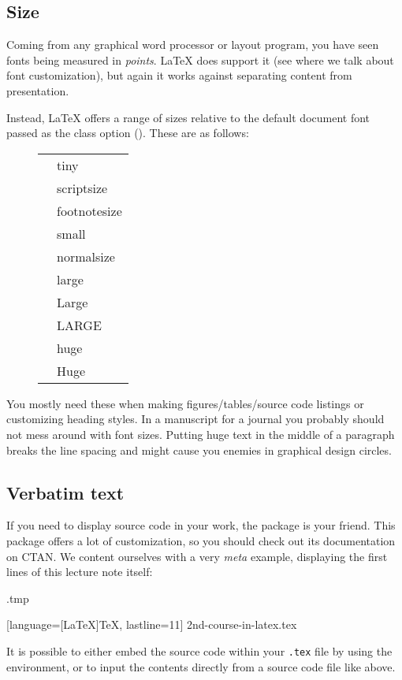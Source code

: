 %
%
\subsection{Size}\label{sec:font size}

Coming from any graphical word processor or layout program,
you have seen fonts being measured in \emph{points}.
\LaTeX{} does support it (see  where we talk about font customization),
but again it works against separating content from presentation.

Instead, \LaTeX{} offers a range of sizes relative to the default document font
passed as the class option ().
These are as follows:
%
\begin{figure}[h]
\centering
\newcommand{\example}[1]{\cmd{#1}\texttt &%
    \csname#1\endcsname{Example text}}
\begin{tabular}{l|l}
\example{tiny}\\
\example{scriptsize}\\
\example{footnotesize}\\
\example{small}\\
\example{normalsize}\\
\example{large}\\
\example{Large}\\
\example{LARGE}\\
\example{huge}\\
\example{Huge}
\end{tabular}
\end{figure}

You mostly need these when making figures/tables/source code listings
or customizing heading styles.
In a manuscript for a journal you probably should not mess around with font sizes.
Putting {\huge huge text} in the middle of a paragraph
breaks the line spacing and might cause you enemies in graphical design circles.


%
%
\subsection{Verbatim text}

If you need to display source code in your work,
the  package is your friend.
This package offers a lot of customization,
so you should check out its documentation on CTAN.
We content ourselves with a very \emph{meta} example,
displaying the first lines of this lecture note itself:
%
\begin{VerbatimOut}{\jobname.tmp}


  [language={[LaTeX]TeX}, lastline=11]
  {2nd-course-in-latex.tex}
\end{VerbatimOut}
\ShowExample
%
It is possible to either embed the source code within your \verb|.tex| file
by using the  environment,
or to input the contents directly from a source code file like above.

